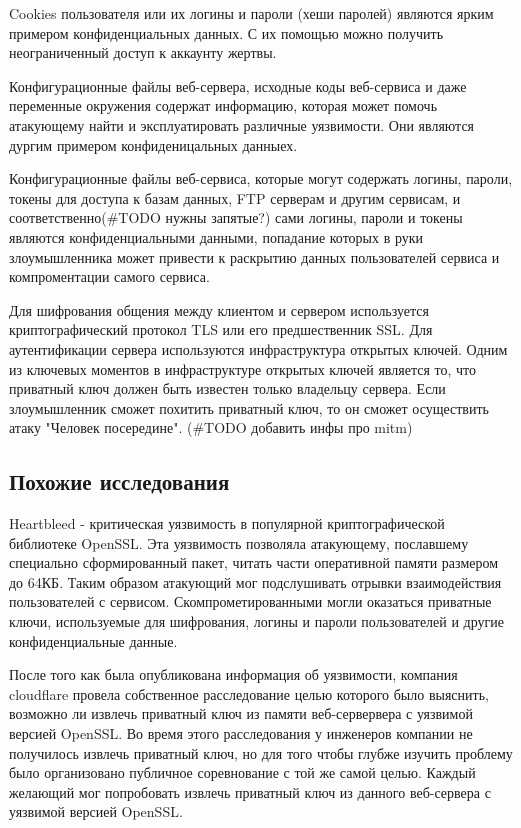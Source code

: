 \documentclass[20pt]{article}
\begin{document}
Cookies пользователя или их логины и пароли (хеши паролей) являются ярким
примером конфиденциальных данных. С их помощью можно получить неограниченный
доступ к аккаунту жертвы.

Конфигурационные файлы веб-сервера, исходные коды веб-сервиса и даже переменные
окружения содержат информацию, которая может помочь атакующему найти и
эксплуатировать различные уязвимости. Они являются дургим примером
конфиденицальных данныех.

Конфигурационные файлы веб-сервиса, которые могут содержать логины, пароли, токены
для доступа к базам данных, FTP серверам и другим сервисам, и соответственно(#TODO нужны запятые?) сами
логины, пароли и токены являются конфиденциальными данными, попадание которых в
руки злоумышленника может привести к раскрытию данных пользователей сервиса и
компроментации самого сервиса.

Для шифрования общения между клиентом и сервером используется криптографический
протокол TLS\cite{tls} или его предшественник SSL. Для аутентификации сервера
используются инфраструктура открытых ключей\cite{pki}. Одним из ключевых моментов
в инфраструктуре открытых ключей является то, что приватный ключ должен быть
известен только владельцу сервера. Если злоумышленник сможет похитить приватный
ключ, то он сможет осуществить атаку "Человек посередине"\cite{mitm}.
(#TODO добавить инфы про mitm)

\subsection{Похожие исследования}
Heartbleed\cite{heartbleed} - критическая уязвимость в популярной криптографической
библиотеке OpenSSL. Эта уязвимость позволяла атакующему, пославшему специально
сформированный пакет, читать части оперативной памяти размером до 64КБ. Таким
образом атакующий мог подслушивать отрывки взаимодействия пользователей с сервисом.
Скомпрометированными могли оказаться приватные ключи, используемые для шифрования,
логины и пароли пользователей и другие конфиденциальные данные.

После того как была опубликована информация об уязвимости, компания cloudflare
провела собственное расследование\cite{heartbleed/investigation} целью которого
было выяснить, возможно ли извлечь приватный ключ из памяти веб-сервервера с
уязвимой версией OpenSSL. Во время этого расследования у инженеров компании не
получилось извлечь приватный ключ, но для того чтобы глубже изучить проблему
было организовано публичное соревнование\cite{hearbleed/investigation} с той же
самой целью. Каждый желающий мог попробовать извлечь приватный ключ из
данного веб-сервера с уязвимой версией OpenSSL.
\end{document}
